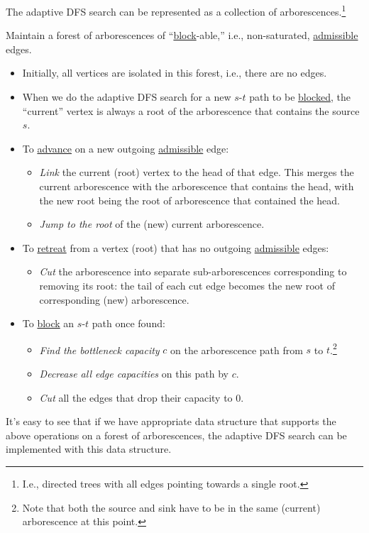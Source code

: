 \begin{claim}\label{clm:adaptive-DFS-link-cut-tree}
	The adaptive DFS search can be represented as a collection of arborescences.\footnote{I.e., directed trees with all edges pointing towards a single root.}
\end{claim}
\begin{explanation}
	Maintain a forest of arborescences of ``\hyperref[algo:adaptive-DFS-block]{block}-able,'' i.e., non-saturated, \hyperref[def:admissible]{admissible} edges.
	\begin{itemize}
		\item Initially, all vertices are isolated in this forest, i.e., there are no edges.
		\item When we do the adaptive DFS search for a new \(s\)-\(t\) path to be \hyperref[algo:adaptive-DFS-block]{blocked}, the ``current'' vertex is always a root of the arborescence that contains the source \(s\).
		\item To \hyperref[algo:adaptive-DFS-advance]{advance} on a new outgoing \hyperref[def:admissible]{admissible} edge:
		      \begin{itemize}
			      \item \emph{Link} the current (root) vertex to the head of that edge. This merges the current arborescence with the arborescence that contains the head, with the new root being the root of arborescence that contained the head.
			      \item \emph{Jump to the root} of the (new) current arborescence.
		      \end{itemize}
		\item To \hyperref[algo:adaptive-DFS-retreat]{retreat} from a vertex (root) that has no outgoing \hyperref[def:admissible]{admissible} edges:
		      \begin{itemize}
			      \item \emph{Cut} the arborescence into separate sub-arborescences corresponding to removing its root: the tail of each cut edge becomes the new root of corresponding (new) arborescence.
		      \end{itemize}
		\item To \hyperref[algo:adaptive-DFS-block]{block} an \(s\)-\(t\) path once found:
		      \begin{itemize}
			      \item \emph{Find the bottleneck capacity} \(c\) on the arborescence path from \(s\) to \(t\).\footnote{Note that both the source and sink have to be in the same (current) arborescence at this point.}
			      \item \emph{Decrease all edge capacities} on this path by \(c\).
			      \item \emph{Cut} all the edges that drop their capacity to \(0\).
		      \end{itemize}
	\end{itemize}
	It's easy to see that if we have appropriate data structure that supports the above operations on a forest of arborescences, the adaptive DFS search can be implemented with this data structure.
\end{explanation}

